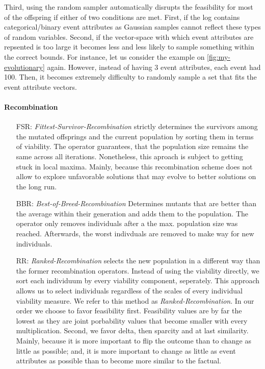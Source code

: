 \documentclass[./../../paper.tex]{subfiles}
\begin{document}
Third, using the random sampler automatically disrupts the feasibility for most of the offspring if either of two conditions are met. First, if the log contains categorical/binary event attributes as Gaussian samples cannot reflect these types of random variables. Second, if the vector-space with which event attributes are repsented is too large it becomes less and less likely to sample something within the correct bounds.
For instance, let us consider the example on \autoref{fig:my-evolutionary} again.
However, instead of having 3 event attributes, each event had 100. Then, it becomes extremely difficulty to randomly sample a set that fits the event attribute vectors.

\paragraph{Recombination}
\begin{enumerate}
    \item[FSR:] \emph{Fittest-Survivor-Recombination} strictly determines the survivors among the mutated offsprings and the current population by sorting them in terms of viability.
          The operator guarantees, that the population size remains the same across all iterations.
          Nonetheless, this aproach is subject to getting stuck in local maxima. Mainly, because this recombination scheme does not allow to explore unfavorable solutions that may evolve to better solutions on the long run.
    \item[BBR:] \emph{Best-of-Breed-Recombination} Determines mutants that are better than the average within their generation and adds them to the population. The operator only removes individuals after a the max. population size was reached. Afterwards, the worst indivduals are removed to make way for new individuals.
    \item[RR:] \emph{Ranked-Recombination} selects the new population in a different way than the former recombination operators. Instead of using the viability directly, we sort each individuum by every viability component, seperately. This approach allows us to select individuals regardless of the scales of every individual viability measure. We refer to this method as \emph{Ranked-Recombination}. In our order we choose to favor feasibility first. Feasibility values are by far the lowest as they are joint porbability values that become smaller with every multiplication. Second, we favor delta, then sparcity and at last similarity. Mainly, because it is more important to flip the outcome than to change as little as possible; and, it is more important to change as little as event attributes as possible than to become more similar to the factual.
\end{enumerate}
\end{document}
